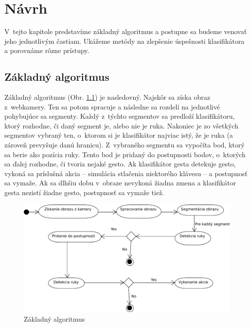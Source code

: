 \chapter{Návrh}\label{chap:design}

V~tejto kapitole predstavíme základný algoritmus a postupne sa budeme venovať jeho jednotlivým častiam. Ukážeme metódy na zlepšenie úspešnosti klasifikátora a porovnáme rôzne prístupy. 
\bigskip

\section{Základný algoritmus}

Základný algoritmus (Obr. \ref{fig:base_alg}) je nasledovný. Najskôr sa získa obraz z~webkamery. Ten sa potom spracuje a následne sa rozdelí na jednotlivé pohybujúce sa segmenty.
Každý z~týchto segmentov sa predloží klasifikátoru, ktorý rozhodne, či daný segment je, alebo nie je ruka. Nakoniec je zo všetkých segmentov vybraný ten, o~ktorom si je klasifikátor najviac istý, že je ruka (a zároveň prevyšuje danú hranicu). Z~vybraného segmentu sa vypočíta bod, ktorý sa berie ako pozícia ruky. Tento bod je pridaný do postupnosti bodov, o~ktorých sa ďalej rozhodne, či tvoria nejaké gesto. Ak klasifikátor gesta detekuje gesto, vykoná sa príslušná akcia -- simulácia stlačenia niektorého klávesu -- a postupnosť sa vymaže. Ak sa dlhšiu dobu v~obraze nevykoná žiadna zmena a klasifikátor gesta nezistí žiadne gesto, postupnosť sa vymaže tiež.

\begin{figure}[htp]
    \centering
    \includegraphics[width=\textwidth]{images/BaseAlgorithm}
    \caption{Základný algoritmus}
    \label{fig:base_alg}
\end{figure}

